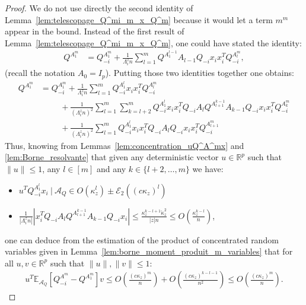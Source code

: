 \documentclass[a4papaer, titlepage]{book}
\begin{document}
\begin{proof}
We do not use directly the second identity of Lemma~\ref{lem:telescopage_Q^mi_m_x_Q^m} because it would let a term $m^m$ appear in the bound.
Instead of the first result of Lemma~\ref{lem:telescopage_Q^mi_m_x_Q^m}, one could have stated the identity:
\begin{align*}
  Q^{A_1^{m}}
  &=Q_{-i}^{A_1^{m}}
  +\frac{1}{\Lambda_i^zn}\sum_{l=1}^{m} Q^{A_1^{l-1}}A_{l-1}Q_{-i}x_ix_i^TQ_{-i}^{A^{m}_{l}},
\end{align*}
(recall the notation $A_0 = I_p$).
Putting those two identities together one obtains:
\begin{align}\label{eq:simplification_Qm_Qmim}
  Q^{A_1^{m}}
  &=Q_{-i}^{A_1^{m}}
  +\frac{1}{\Lambda_i^zn}\sum_{l=1}^m  Q_{-i}^{A_1^{l}}x_ix_i^TQ_{-i}^{A_{l}^{m}} \nonumber\\
  &\hspace{1cm}+\frac{1}{(\Lambda_i^zn)^2}\sum_{l=1}^m \sum_{k=l+2}^m Q_{-i}^{A_1^{l}}x_ix_i^TQ_{-i}A_lQ^{A_{l+1}^{k-1}}A_{k-1}Q_{-i}x_ix_i^TQ_{-i}^{A^{m}_{k}} \nonumber\\
  &\hspace{1cm}  + \frac{1}{(\Lambda_i^zn)^2}\sum_{l=1}^m  Q_{-i}^{A_1^{l}}x_ix_i^TQ_{-i}A_lQ_{-i}x_ix_i^TQ_{-i}^{A^{m}_{l+1}}
\end{align}
Thus, knowing from Lemmas~\ref{lem:concentration_uQ^A^mx} and \ref{lem:Borne_resolvante} that given any deterministic vector $u \in \mathbb R^p$ such that $\|u\| \leq 1$, any $l \in [m]$ and any $k \in \{l+2,\ldots, m\}$ we have:
\begin{itemize}
  \item $u^TQ_{-i}^{A_1^{l}}x_i \ | \ \mathcal A_Q \in O(\kappa_z^l) \pm \mathcal E_2((c\kappa_z)^l)$
  \item $\frac{1}{|\Lambda^z_i n|} \left\vert x_i^TQ_{-i}A_lQ^{A_{l+1}^{k-1}}A_{k-1}Q_{-i}x_i \right\vert \leq \frac{\kappa_z^{k-l+1} \check \kappa_z^2}{|z|n} \leq O \left( \frac{\kappa_z^{k-l}}{n} \right)$,
\end{itemize}
one can deduce from the estimation of the product of concentrated random variables given in Lemma~\ref{lem:borne_moment_produit_m_variables} that for all $u,v \in \mathbb R^p$ such that $\|u\|,\|v\| \leq 1$:
\begin{align*}
  u^T \mathbb E_{\mathcal A_Q}  \left[  Q_{-i}^{A^m} - Q^{A_1^m} \right]v
  \leq O \left( \frac{(c\kappa_z)^{m}}{n} \right) + O \left( \frac{(c\kappa_z)^{k-l-1}}{n^2} \right) \leq O \left( \frac{(c\kappa_z)^{m}}{n} \right).
\end{align*}

\end{proof}
\end{document}
